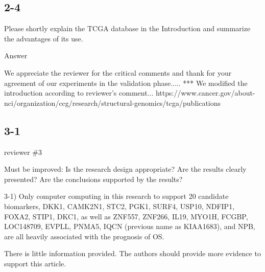 \documentclass[preprint,12pt]{elsarticle}
\newenvironment{MyColorPar}[1]{%
    \leavevmode\color{#1}\ignorespaces%
}{%
}%
\begin{document}
\subsection*{2-4}
Please shortly explain the TCGA database in the Introduction and summarize the advantages of its use.

\begin{MyColorPar}{blue}
Answer

We appreciate the reviewer for the critical comments and thank for your agreement of our experiments in the validation phase.....
*** We modified the introduction according to reviewer's comment...
https://www.cancer.gov/about-nci/organization/ccg/research/structural-genomics/tcga/publications
\end{MyColorPar}



\subsection*{3-1}
reviewer \#3

Must be improved:
Is the research design appropriate?
Are the results clearly presented?
Are the conclusions supported by the results?

3-1) Only computer computing in this research to support 20 candidate biomarkers, DKK1, CAMK2N1, STC2, PGK1, SURF4, USP10, NDFIP1, FOXA2, STIP1, DKC1, as well as ZNF557, ZNF266, IL19, MYO1H, FCGBP, LOC148709, EVPLL, PNMA5, IQCN (previous name as KIAA1683), and NPB, are all heavily associated with the prognosis of OS.

There is little information provided. The authors should provide more evidence to support this article.
\end{document}
